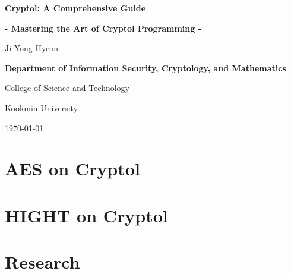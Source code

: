 \documentclass[12pt,openany]{book}
\begin{document}
	
	\begin{titlepage}
		\begin{center}
			{\Huge\textsf{\textbf{Cryptol: A Comprehensive Guide}}\par}
			{\Large\textsf{\textbf{- Mastering the Art of Cryptol Programming -}}\par}
			\vspace{0.5in}
			{\Large {Ji Yong-Hyeon}\par}
			\vspace{1in}
			\vspace{1in}
			{\large\bf \textsf{Department of Information Security, Cryptology, and Mathematics}\par}
			{\textsf{College of Science and Technology}\par}
			{\textsf{Kookmin University}\par}
			\vspace{.25in}
			{\large \textsf{\today}\par}
		\end{center}
	\end{titlepage}
	
	\frontmatter
	
%	
	
	\newpage
	\tableofcontents
	
	\newpage
	\mainmatter
	
	
	\newpage
	
	\chapter{AES on Cryptol}
	
	\chapter{HIGHT on Cryptol}
	
	
	\newpage\chapter{Research}
	
	
%	
%	
	
	\appendix
%	
%	
%	
	
	\backmatter
	
	
\end{document}
